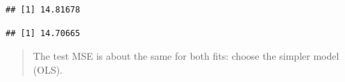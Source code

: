 \documentclass[]{article}
\newenvironment{Shaded}{\begin{snugshade}}{\end{snugshade}}
\newcommand{\DecValTok}[1]{\textcolor[rgb]{0.00,0.00,0.81}{#1}}
\newcommand{\KeywordTok}[1]{\textcolor[rgb]{0.13,0.29,0.53}{\textbf{#1}}}
\newcommand{\NormalTok}[1]{#1}
\newcommand{\OperatorTok}[1]{\textcolor[rgb]{0.81,0.36,0.00}{\textbf{#1}}}
\newcommand{\StringTok}[1]{\textcolor[rgb]{0.31,0.60,0.02}{#1}}
\begin{document}
\begin{verbatim}
## [1] 14.81678
\end{verbatim}

\begin{Shaded}
\end{Shaded}

\begin{verbatim}
## [1] 14.70665
\end{verbatim}

\begin{quote}
The test MSE is about the same for both fits: choose the simpler model
(OLS).
\end{quote}
\end{document}
